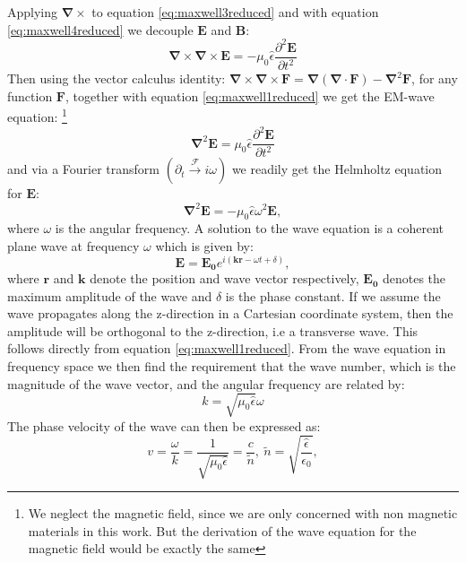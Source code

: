 Applying $\bm{\nabla}\times$ to equation \ref{eq:maxwell3reduced} and with equation \ref{eq:maxwell4reduced} we decouple $\bm{E}$ and $\bm{B}$: 
\begin{equation}
    \bm{\nabla}\times \bm{\nabla}\times \bm{E} = -\mu_0 \hat{\epsilon} \frac{\partial^2\bm{E}}{\partial t^2}
\end{equation}
Then using the vector calculus identity: $\bm{\nabla}\times \bm{\nabla}\times \bm{F} = \bm{\nabla} \left( \bm{\nabla} \cdot \bm{F} \right) - \bm{\nabla}^2 \bm{F}$, for any function $\bm{F}$, together with equation \ref{eq:maxwell1reduced} we get the EM-wave equation: \footnote{We neglect the magnetic field, since we are only concerned with non magnetic materials in this work. But the derivation of the wave equation for the magnetic field would be exactly the same}
\begin{equation}
    \label{eq:waveeq}
    \bm{\nabla}^2 \bm{E} = \mu_0 \hat{\epsilon} \frac{\partial^2\bm{E}}{\partial t^2}
\end{equation}
and via a Fourier transform $(\partial_t \xrightarrow{\mathscr{F}} i\omega)$ we readily get the Helmholtz equation for $\bm{E}$:
\begin{equation}
    \label{eq:waveeqfreq}
    \bm{\nabla}^2 \bm{E} = -\mu_0 \hat{\epsilon} \omega^2 \bm{E},
\end{equation}
where $\omega$ is the angular frequency.
A solution to the wave equation is a coherent plane wave at frequency $\omega$ which is given by: 
\begin{equation}
    \label{eq:planewave}
    \bm{E} = \bm{E_0} e^{i(\bm{k}\bm{r} - \omega t + \delta)},
\end{equation}
where $\bm{r}$ and $\bm{k}$ denote the position and wave vector respectively, $\bm{E_0}$ denotes the maximum amplitude of the wave and $\delta$ is the phase constant. If we assume the wave propagates along the z-direction in a Cartesian coordinate system, then the amplitude will be orthogonal to the z-direction, i.e a transverse wave. This follows directly from equation \ref{eq:maxwell1reduced}. From the wave equation in frequency space we then find the requirement that the wave number, which is the magnitude of the wave vector, and the angular frequency are related by:
\begin{equation}
    \label{eq:wavevector_req}
    k = \sqrt{\mu_0 \hat{\epsilon}} \omega
\end{equation}
The phase velocity of the wave can then be expressed as:
\begin{equation}
    v = \frac{\omega}{k} = \frac{1}{\sqrt{\mu_0 \hat{\epsilon}}} = \frac{c}{\tilde{n}},\:\tilde{n} = \sqrt{\frac{\hat{\epsilon}}{\epsilon_0}},
\end{equation}
